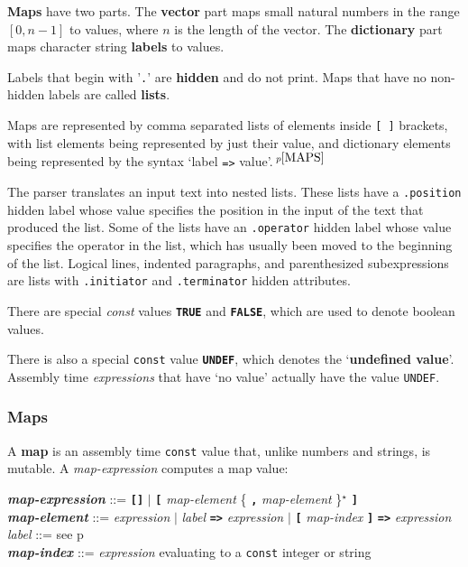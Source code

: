 \documentclass[12pt]{article}
\newcommand{\TT}[1]{{\tt \bfseries #1}}
\newcommand{\STAR}{{\Large $^\star$}}
\newcommand{\key}[1]{{\rm \bfseries #1}}
\newcommand{\ttkey}[1]{{\tt \bfseries #1}}
\newcommand{\emkey}[1]{{\em \bfseries #1}}
\newcommand{\pagref}[1]{p\pageref{#1}}
\newcommand{\pagnote}[1]{$\,^{p\pageref{#1}}$}
\newenvironment{indpar}[1][0.3in]%
	{\begin{list}{}%
		     {\setlength{\itemsep}{0in}%
		      \setlength{\topsep}{0in}%
		      \setlength{\parsep}{1ex}%
		      \setlength{\labelwidth}{#1}%
		      \setlength{\leftmargin}{#1}%
		      \addtolength{\leftmargin}{\labelsep}}%
	 \item}%
	{\end{list}}
\begin{document}
\key{Maps} have two parts.  The \key{vector} part maps small
natural numbers in the range $[0,n-1]$ to values, where $n$
is the length of the vector.  The \key{dictionary} part maps
character string \key{labels} to values.

Labels that begin with '{\tt .}' are \key{hidden} and do not
print.  Maps that have no non-hidden labels are called \key{lists}.

Maps are represented by comma separated lists of elements inside
{\tt [~]} brackets, with list elements being represented by
just their value, and dictionary elements being represented
by the syntax `label {\tt =>} value'.\pagnote{MAPS}

The parser translates an input text into nested lists.  These
lists have a {\tt .position} hidden label whose value specifies
the position in the input of the text that produced the list.
Some of the lists have an {\tt .operator} hidden label whose
value specifies the operator in the list, which has usually
been moved to the beginning of the list.  Logical lines,
indented paragraphs, and parenthesized subexpressions
are lists with {\tt .initiator} and {\tt .terminator}
hidden attributes.

There are special {\em const} values \ttkey{TRUE} and
\ttkey{FALSE}, which are used to denote boolean values.

There is also a special {\tt const} value \ttkey{UNDEF},
which denotes the `\key{undefined value}'.  Assembly time
{\em expressions} that have `no value' actually have the
value {\tt UNDEF}.

\subsubsection{Maps}
\label{MAPS}

A \key{map} is an assembly time {\tt const} value that, unlike
numbers and strings, is mutable.
A {\em map-expression} computes a map value:

\begin{indpar}
\emkey{map-expression} ::=
    \TT{[]} $|$
    \TT{[} {\em map-element} \{ \TT{,} {\em map-element} \}\STAR{} \TT{]}
\\[0.5ex]
\emkey{map-element} ::=
        {\em expression} $|$ {\em label} \TT{=>} {\em expression}
	                 $|$ \TT{[} {\em map-index} \TT{]}
			 	\TT{=>} {\em expression}
\\[0.5ex]
{\em label} ::= see \pagref{LABEL}
\\[0.5ex]
\emkey{map-index} ::=
    {\em expression} evaluating to a {\tt const} integer or string
\end{indpar}
\end{document}
